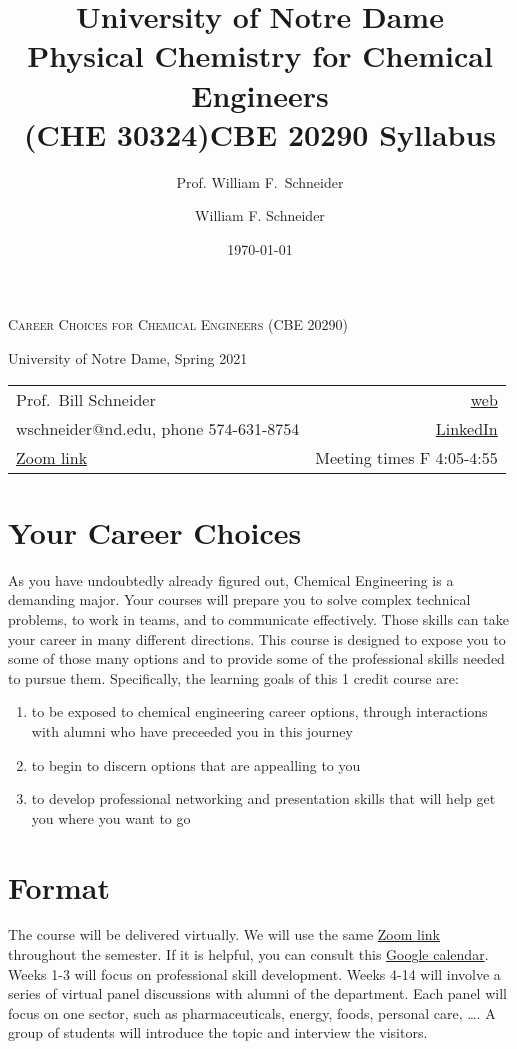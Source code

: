\documentclass[11pt]{article}
\title{University of Notre Dame\\Physical Chemistry for Chemical Engineers\\(CHE 30324)}
\author{Prof. William F.\ Schneider}
\author{William F. Schneider}
\date{\today}
\title{CBE 20290  Syllabus}
\begin{document}
\begin{OPTIONS}
\end{OPTIONS}

\begin{center}
\textsc{Career Choices for Chemical Engineers (CBE 20290)}

University of Notre Dame, Spring 2021
\end{center}

\begin{center}
\begin{tabular}{lr}
\hline
Prof.~Bill Schneider & \href{https://www.nd.edu/\~wschnei1}{web}\\
wschneider@nd.edu, phone 574-631-8754 & \href{https://www.linkedin.com/in/william-schneider-570091a/}{LinkedIn}\\
\href{https://notredame.zoom.us/j/91572218330?pwd=WFFvRW9DU3UvMHhXUTBwQUNIZzd0dz09}{Zoom link} & Meeting times F 4:05-4:55\\
\hline
\end{tabular}
\end{center}

\section{Your Career Choices}
\label{sec:org9c86bea}
As you have undoubtedly already figured out, Chemical Engineering is a demanding major. Your courses will prepare you to solve complex technical problems, to work in teams, and to communicate effectively.  Those skills can take your career in many different directions. This course is designed to expose you to some of those many options and to provide some of the professional skills needed to pursue them. Specifically, the learning goals of this 1 credit course are:

\begin{enumerate}
\item to be exposed to chemical engineering career options, through interactions with alumni who have preceeded you in this journey
\item to begin to discern options that are appealling to you
\item to develop  professional networking and presentation skills that will help get you where you want to go
\end{enumerate}

\section{Format}
\label{sec:org2df2e3c}
The course will be delivered virtually. We will use the same \href{https://notredame.zoom.us/j/91572218330?pwd=WFFvRW9DU3UvMHhXUTBwQUNIZzd0dz09}{Zoom link} throughout the semester. If it is helpful, you can consult this \href{https://calendar.google.com/calendar/u/0?cid=Y183NG02cDJnYWQ2NDQ4OTUzZGthaHJia2Nnc0Bncm91cC5jYWxlbmRhci5nb29nbGUuY29t}{Google calendar}.  Weeks 1-3 will focus on professional skill development. Weeks 4-14 will involve a series of virtual panel discussions with alumni of the department. Each panel will focus on one sector, such as pharmaceuticals, energy, foods, personal care, \ldots.  A group of students will introduce the topic and interview the visitors.
\end{document}
